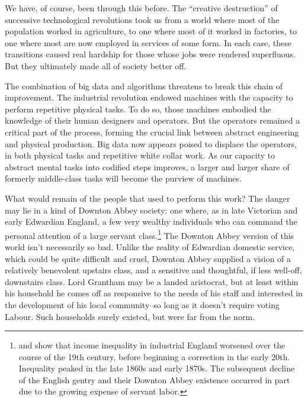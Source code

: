 \documentclass[12pt]{article}
\begin{document}
We have, of course, been through this before. The ``creative
destruction'' of successive technological revolutions took us from a
world where most of the population worked in agriculture, to one where
most of it worked in factories, to one where most are now employed in
services of some form. In each case, these transitions caused real
hardship for those whose jobs were rendered superfluous. But they
ultimately made all of society better off. 

The combination of big data and algorithms threatens to break this
chain of improvement. The industrial revolution endowed machines with
the capacity to perform repetitive physical tasks. To do so, those
machines embodied the knowledge of their human designers and
operators. But the operators remained a critical part of the process,
forming the crucial link between abstract engineering and physical
production. Big data now appears poised to displace the operators, in
both physical tasks and repetitive white collar work. As our capacity
to abstract mental tasks into codified steps improves, a larger and
larger share of formerly middle-class tasks will become the purview of
machines. 

What would remain of the people that used to perform this work? The
danger may lie in a kind of Downton Abbey society: one where, as in
late Victorian and early Edwardian England, a few very
wealthy individuals who can command the personal attention of a large
servant class.\footnote{\cite{lindert1983reinterpreting} and \cite{lindert2000three} show that
  income inequality in industrial England worsened over the course of
  the 19th century, before beginning a correction in the early
  20th. Inequality peaked in the late 1860s and early 1870s. The
  subsequent decline of the English gentry and their Downton Abbey
  existence occurred in part due to the growing expense of servant
  labor.} The Downton Abbey version of this world isn't
necessarily so bad. Unlike the reality of Edwardian domestic service,
which could be quite difficult and cruel, Downton Abbey supplied a
vision of a relatively benevolent upstairs class, and a sensitive and
thoughtful, if less well-off, downstairs class. Lord Grantham may be
a landed aristocrat, but at least within his household he comes off as
responsive to the needs of his staff and interested in the development
of his local community--so long as it doesn't require voting
Labour. Such households surely existed, but were far from the norm.
\end{document}
